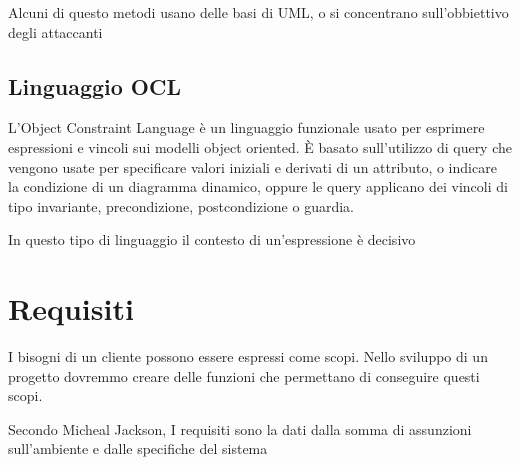 \documentclass[12pt, a4paper]{article}
\begin{document}
Alcuni di questo metodi usano delle basi di UML, o si concentrano sull'obbiettivo degli attaccanti

\subsection{Linguaggio OCL}
L'Object Constraint Language è un linguaggio funzionale usato per esprimere espressioni e vincoli sui modelli object
oriented. È basato sull'utilizzo di query che vengono usate per specificare valori iniziali e derivati di un 
attributo, o indicare la condizione di un diagramma dinamico, oppure le query applicano dei vincoli di tipo
invariante, precondizione, postcondizione o guardia.

In questo tipo di linguaggio il contesto di un'espressione è decisivo

\newpage
\section{Requisiti}
I bisogni di un cliente possono essere espressi come scopi. Nello sviluppo di un progetto dovremmo creare delle 
funzioni che permettano di conseguire questi scopi.

Secondo Micheal Jackson, I requisiti sono la dati dalla somma di assunzioni sull'ambiente e dalle specifiche del 
sistema
\end{document}
